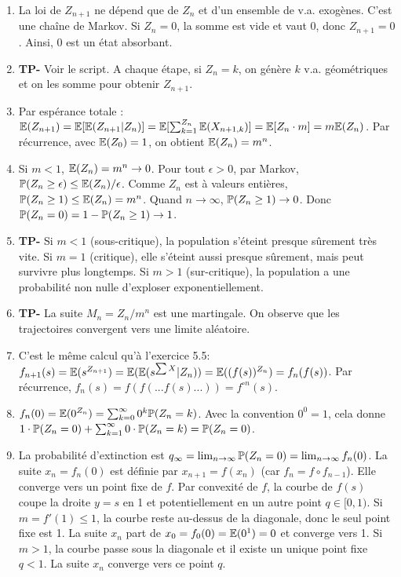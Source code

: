\documentclass[solutions]{exercices}
\begin{document}
\begin{solution}
	\begin{enumerate}
		\item La loi de $Z_{n+1}$ ne dépend que de $Z_n$ et d'un ensemble de v.a. exogènes. C'est une chaîne de Markov. Si $Z_n=0$, la somme est vide et vaut 0, donc $Z_{n+1}=0$. Ainsi, 0 est un état absorbant.
		\item \textbf{TP-} Voir le script. A chaque étape, si $Z_n=k$, on génère $k$ v.a. géométriques et on les somme pour obtenir $Z_{n+1}$.
		\item Par espérance totale : $\E(Z_{n+1}) = \E[\E(Z_{n+1}|Z_n)] = \E[\sum_{k=1}^{Z_n} \E(X_{n+1,k})] = \E[Z_n \cdot m] = m \E(Z_n)$. Par récurrence, avec $\E(Z_0)=1$, on obtient $\E(Z_n)=m^n$.
		\item Si $m<1$, $\E(Z_n) = m^n \to 0$. Pour tout $\epsilon > 0$, par Markov, $\P(Z_n \ge \epsilon) \le \E(Z_n)/\epsilon$. Comme $Z_n$ est à valeurs entières, $\P(Z_n \ge 1) \le \E(Z_n) = m^n$. Quand $n \to \infty$, $\P(Z_n \ge 1) \to 0$. Donc $\P(Z_n=0) = 1-\P(Z_n\ge 1) \to 1$.
		\item \textbf{TP-} Si $m<1$ (sous-critique), la population s'éteint presque sûrement très vite. Si $m=1$ (critique), elle s'éteint aussi presque sûrement, mais peut survivre plus longtemps. Si $m>1$ (sur-critique), la population a une probabilité non nulle d'exploser exponentiellement.
		\item \textbf{TP-} La suite $M_n = Z_n/m^n$ est une martingale. On observe que les trajectoires convergent vers une limite aléatoire.
		\item C'est le même calcul qu'à l'exercice 5.5: $f_{n+1}(s) = \E(s^{Z_{n+1}}) = \E(\E(s^{\sum X}|Z_n)) = \E((f(s))^{Z_n}) = f_n(f(s))$. Par récurrence, $f_n(s) = f(f(...f(s)...)) = f^{\circ n}(s)$.
		\item $f_n(0) = \E(0^{Z_n}) = \sum_{k=0}^\infty 0^k \P(Z_n=k)$. Avec la convention $0^0=1$, cela donne $1 \cdot \P(Z_n=0) + \sum_{k=1}^\infty 0 \cdot \P(Z_n=k) = \P(Z_n=0)$.
		\item La probabilité d'extinction est $q_\infty = \lim_{n\to\infty} \P(Z_n=0) = \lim_{n\to\infty} f_n(0)$. La suite $x_n = f_n(0)$ est définie par $x_{n+1}=f(x_n)$ (car $f_n=f \circ f_{n-1}$). Elle converge vers un point fixe de $f$.
		      Par convexité de $f$, la courbe de $f(s)$ coupe la droite $y=s$ en 1 et potentiellement en un autre point $q \in [0,1)$. Si $m=f'(1) \le 1$, la courbe reste au-dessus de la diagonale, donc le seul point fixe est 1. La suite $x_n$ part de $x_0=f_0(0)=\E(0^1)=0$ et converge vers 1. Si $m > 1$, la courbe passe sous la diagonale et il existe un unique point fixe $q < 1$. La suite $x_n$ converge vers ce point $q$.
	\end{enumerate}
\end{solution}
\end{document}
